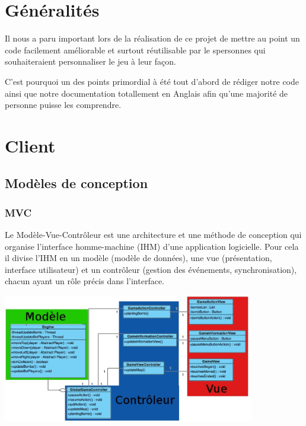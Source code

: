 \section{Généralités}

	Il nous a paru important lors de la réalisation de ce projet
	de mettre au point un code facilement améliorable et surtout
	réutilisable par le spersonnes qui souhaiteraient personnaliser
	le jeu à leur façon.
	
	C'est pourquoi un des points primordial à été tout d'abord de
	rédiger notre code ainsi que notre documentation totallement 
	en Anglais afin qu'une majorité de personne puisse les comprendre.

\section{Client}

	\subsection{Modèles de conception}
	
		\subsubsection{MVC}
		
			Le Modèle-Vue-Contrôleur est une architecture et une méthode de
			conception qui organise l'interface homme-machine (IHM) d'une 
			application logicielle.
			Pour cela il divise l'IHM en un modèle (modèle de données),
			une vue (présentation, interface utilisateur) et un contrôleur
			(gestion des événements, synchronisation), chacun ayant un rôle
			précis dans l'interface.
			
			\begin{center}
				\includegraphics[width=11cm]{./Reutilisabilite/Img/mvc.eps}
			\end{center} 
			
